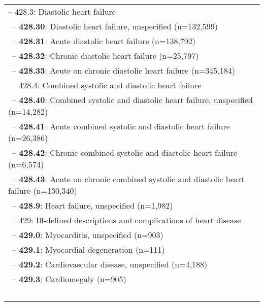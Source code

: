 \begin{longtable}{p{\textwidth}}
\hspace{30pt}\footnotesize{-- 428.3: Diastolic heart failure} \\ \-\ \hspace{40pt}\footnotesize{-- {\color{ForestGreen} \textbf{428.30}}: Diastolic heart failure, unspecified (n=132,599)} \\ \-\ \hspace{40pt}\footnotesize{-- {\color{ForestGreen} \textbf{428.31}}: Acute diastolic heart failure (n=138,792)} \\ \-\ \hspace{40pt}\footnotesize{-- {\color{ForestGreen} \textbf{428.32}}: Chronic diastolic heart failure (n=25,797)} \\ \-\ \hspace{40pt}\footnotesize{-- {\color{ForestGreen} \textbf{428.33}}: Acute on chronic diastolic heart failure (n=345,184)} \\ \-\ \hspace{30pt}\footnotesize{-- 428.4: Combined systolic and diastolic heart failure} \\ \-\ \hspace{40pt}\footnotesize{-- {\color{ForestGreen} \textbf{428.40}}: Combined systolic and diastolic heart failure, unspecified (n=14,282)} \\ \-\ \hspace{40pt}\footnotesize{-- {\color{ForestGreen} \textbf{428.41}}: Acute combined systolic and diastolic heart failure (n=26,386)} \\ \-\ \hspace{40pt}\footnotesize{-- {\color{ForestGreen} \textbf{428.42}}: Chronic combined systolic and diastolic heart failure (n=6,574)} \\ \-\ \hspace{40pt}\footnotesize{-- {\color{ForestGreen} \textbf{428.43}}: Acute on chronic combined systolic and diastolic heart failure (n=130,340)} \\ \-\ \hspace{30pt}\footnotesize{-- {\color{ForestGreen} \textbf{428.9}}: Heart failure, unspecified (n=1,982)} \\ \-\ \hspace{20pt}\footnotesize{-- 429: Ill-defined descriptions and complications of heart disease} \\ \-\ \hspace{30pt}\footnotesize{-- {\color{ForestGreen} \textbf{429.0}}: Myocarditis, unspecified (n=903)} \\ \-\ \hspace{30pt}\footnotesize{-- {\color{ForestGreen} \textbf{429.1}}: Myocardial degeneration (n=111)} \\ \-\ \hspace{30pt}\footnotesize{-- {\color{ForestGreen} \textbf{429.2}}: Cardiovascular disease, unspecified (n=4,188)} \\ \-\ \hspace{30pt}\footnotesize{-- {\color{ForestGreen} \textbf{429.3}}: Cardiomegaly (n=905)} \\ \-\ \hspace{30pt}\footnotesize{-- 
\end{longtable}

